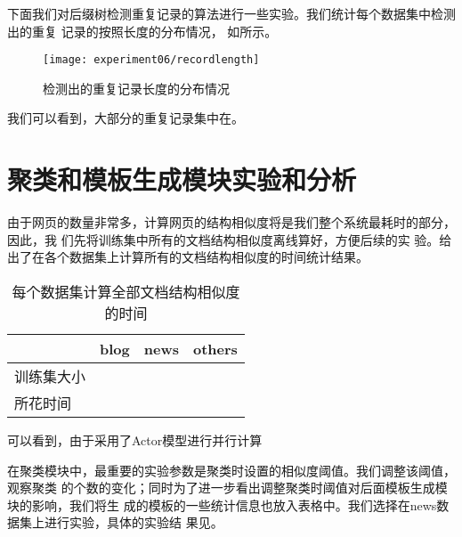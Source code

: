 下面我们对后缀树检测重复记录的算法进行一些实验。我们统计每个数据集中检测出的重复
记录的按照长度的分布情况，
如所示。%
\begin{figure}[hb]
  \centering
  \texttt{[image: experiment06/recordlength]}
  \caption{检测出的重复记录长度的分布情况}
  \label{experiment:fig:recordlength}
\end{figure}

我们可以看到，大部分的重复记录集中在。%

\section{聚类和模板生成模块实验和分析}
由于网页的数量非常多，计算网页的结构相似度将是我们整个系统最耗时的部分，因此，我
们先将训练集中所有的文档结构相似度离线算好，方便后续的实
验。给出了在各个数据集上计算所有的文档结构相似度的时间统计结果。 %
\begin{table}[h]
  \centering
\begin{tabular}{llll}
  \toprule
 & blog & news & others \\
\hline
训练集大小 &  &  &  \\
所花时间 &  &  &  \\
\bottomrule
\end{tabular}
\caption{每个数据集计算全部文档结构相似度的时间}
\label{experiment:tab:calcsim}
\end{table}
\begin{comment}
#+ORGTBL: SEND 计算时间 orgtbl-to-latex :splice nil :skip 0
|            | blog | news | others |
|------------+------+------+--------|
| 训练集大小 |      |      |        |
| 所花时间   |      |      |        |
\end{comment}

可以看到，由于采用了Actor模型进行并行计算%

在聚类模块中，最重要的实验参数是聚类时设置的相似度阈值。我们调整该阈值，观察聚类
的个数的变化；同时为了进一步看出调整聚类时阈值对后面模板生成模块的影响，我们将生
成的模板的一些统计信息也放入表格中。我们选择在news数据集上进行实验，具体的实验结
果见。%

